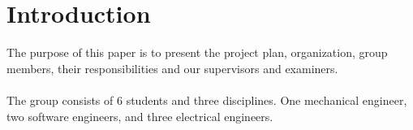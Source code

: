 \section{Introduction}

The purpose of this paper is to present the project plan, organization, group members, their responsibilities and our supervisors and examiners. 
\\\\
The group consists of 6 students and three disciplines. One mechanical engineer, two software engineers, and three electrical engineers. 


